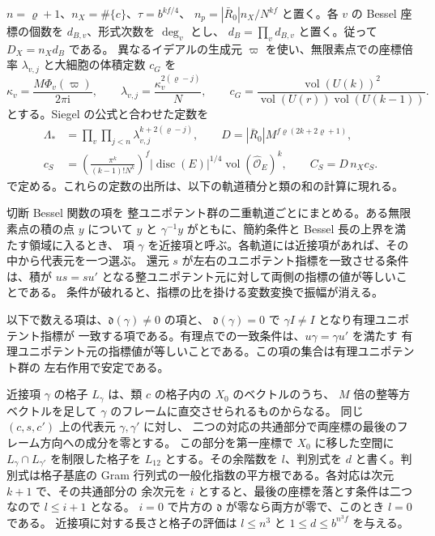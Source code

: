 \(n=\varrho+1\)、\(n_X=\#\{c\}\)、\(\tau=b^{kf/4}\)、
\(n_p=|\bar R_0|n_X/N^{kf}\) と置く。各 \(v\) の Bessel 座標の個数を \(d_{B,v}\)、形式次数を \(\deg_v\) とし、
\(d_B=\prod_v d_{B,v}\) と置く。従って \(D_X=n_Xd_B\) である。
異なるイデアルの生成元 \(\varpi\) を使い、無限素点での座標倍率
\(\lambda_{v,j}\) と大細胞の体積定数 \(c_G\) を
\[
 \kappa_v=\frac{M\Phi_v(\varpi)}{2\pi\mathrm i},\qquad
 \lambda_{v,j}=\frac{\kappa_v^{2(\varrho-j)}}{N},\qquad
 c_G=\frac{\operatorname{vol}(U(k))^2}
          {\operatorname{vol}(U(r))\operatorname{vol}(U(k-1))}.
\]
とする。Siegel の公式と合わせた定数を
\[
 \begin{split}
 \Lambda_\ast&=\prod_v\prod_{j<n}
                          \lambda_{v,j}^{k+2(\varrho-j)},\qquad
 D=|\bar R_0|M^{f\varrho(2k+2\varrho+1)},\\
 c_S&=\left(\frac{\pi^k}{(k-1)!N^k}\right)^f
       |\operatorname{disc}(E)|^{1/4}
       \operatorname{vol}(\widehat{\mathcal O}_E)^k,\qquad C_S=D\,n_Xc_S .
 \end{split}
\]
で定める。これらの定数の出所は、以下の軌道積分と類の和の計算に現れる。

切断 Bessel 関数の項を
整ユニポテント群の二重軌道ごとにまとめる。ある無限素点の積の点 \(y\) について
\(y\) と \(\gamma^{-1}y\) がともに、簡約条件と Bessel 長の上界を満たす領域に入るとき、
項 \(\gamma\) を近接項と呼ぶ。各軌道には近接項があれば、その中から代表元を一つ選ぶ。
還元 \(s\) が左右のユニポテント指標を一致させる条件は、積が
\(us=su'\) となる整ユニポテント元に対して両側の指標の値が等しいことである。
条件が破れると、指標の比を掛ける変数変換で振幅が消える。

以下で数える項は、\(\mathfrak d(\gamma)\ne0\) の項と、
\(\mathfrak d(\gamma)=0\) で \(\gamma I\ne I\) となり有理ユニポテント指標が
一致する項である。有理点での一致条件は、\(u\gamma=\gamma u'\) を満たす
有理ユニポテント元の指標値が等しいことである。この項の集合は有理ユニポテント群の
左右作用で安定である。

近接項 \(\gamma\) の格子 \(L_\gamma\) は、類 \(c\) の格子内の \(X_0\) のベクトルのうち、
\(M\) 倍の整等方ベクトルを足して \(\gamma\) のフレームに直交させられるものからなる。
同じ \((c,s,c')\) 上の代表元 \(\gamma,\gamma'\) に対し、
二つの対応の共通部分で両座標の最後のフレーム方向への成分を零とする。
この部分を第一座標で \(X_0\) に移した空間に \(L_\gamma\cap L_{\gamma'}\) を制限した格子を
\(L_{12}\) とする。その余階数を \(l\)、判別式を \(d\) と書く。判別式は格子基底の
Gram 行列式の一般化指数の平方根である。各対応は次元 \(k+1\) で、その共通部分の
余次元を \(i\) とすると、最後の座標を落とす条件は二つなので \(l\le i+1\) となる。
\(i=0\) で片方の \(\mathfrak d\) が零なら両方が零で、このとき \(l=0\) である。
近接項に対する長さと格子の評価は \(l\le n^3\) と \(1\le d\le b^{n^3 f}\) を与える。

